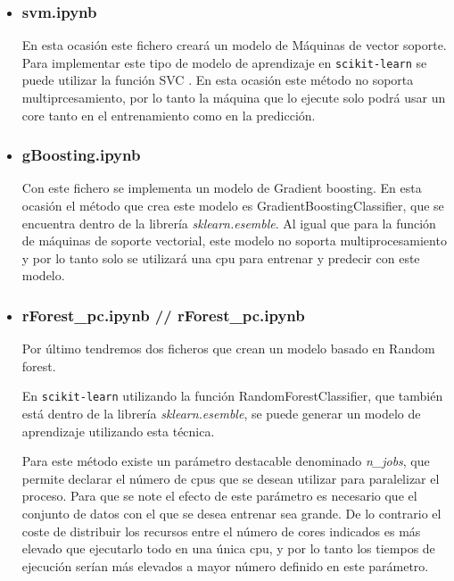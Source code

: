 \documentclass[a4paper, 12pt]{book}
\begin{document}
\begin{itemize}
\item \subsubsection{svm.ipynb} 
\label{subsubsub:svm}

En esta ocasión este fichero creará un modelo de Máquinas de vector soporte. Para implementar este tipo de modelo de aprendizaje en \texttt{scikit-learn} se puede utilizar la función SVC \cite{SVMDocumentation}. En esta ocasión este método no soporta multiprcesamiento, por lo tanto la máquina que lo ejecute solo podrá usar un core tanto en el entrenamiento como en la predicción. 

\item \subsubsection{gBoosting.ipynb} 
\label{subsubsub:gBoosting}

Con este fichero se implementa un modelo de Gradient boosting. En esta ocasión el método que crea este modelo es GradientBoostingClassifier\cite{GradientTreeBDoc}, que se encuentra dentro de la librería \textit{sklearn.esemble}. Al igual que para la función de máquinas de soporte vectorial, este modelo no soporta multiprocesamiento y por lo tanto solo se utilizará una cpu para entrenar y predecir con este modelo. 
\item \subsubsection{rForest\_pc.ipynb // rForest\_pc.ipynb} 
\label{subsubsub:rForest}

Por último tendremos dos ficheros que crean un modelo basado en Random forest.

En \texttt{scikit-learn} utilizando la función RandomForestClassifier\cite{RandomForestDoc}, que también está dentro de la librería \textit{sklearn.esemble}, se puede generar un modelo de aprendizaje utilizando esta técnica.

Para este método existe un parámetro destacable denominado \textit{n\_jobs}, que permite declarar el número de cpus que se desean utilizar para paralelizar el proceso. Para que se note el efecto de este parámetro es necesario que el conjunto de datos con el que se desea entrenar sea grande. De lo contrario el coste de distribuir los recursos entre el número de cores indicados es más elevado que ejecutarlo todo en una única cpu, y por lo tanto los tiempos de ejecución serían más elevados a mayor número definido en este parámetro.


\end{itemize}
\end{document}
